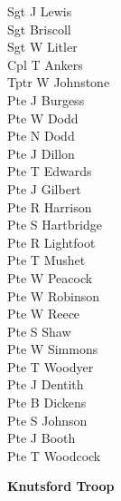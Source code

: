 \vspace*{10mm}

\begin{multicols}{3}
  \small
  \noindent
  Sgt J Lewis \\
  Sgt Briscoll \\
  Sgt W Litler \\
  Cpl T Ankers \\
  Tptr W Johnstone \\
  Pte J Burgess \\
  Pte W Dodd \\
  Pte N Dodd \\
  Pte J Dillon \\
  Pte T Edwards \\
  Pte J Gilbert \\
  Pte R Harrison \\
  Pte S Hartbridge \\
  Pte R Lightfoot \\
  Pte T Mushet \\
  Pte W Peacock \\
  Pte W Robinson \\
  Pte W Reece \\
  Pte S Shaw \\
  Pte W Simmons \\
  Pte T Woodyer \\
  Pte J Dentith \\
  Pte B Dickens \\
  Pte S Johnson \\
  Pte J Booth \\
  Pte T Woodcock \\
\end{multicols}

\vspace*{10mm}

\begin{center}
  \Large
  \textbf{Knutsford Troop}
\end{center}

\vspace*{10mm}

